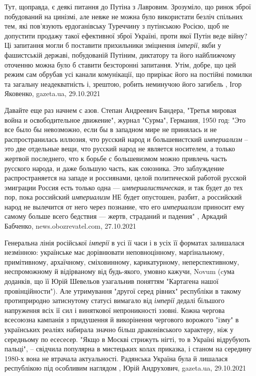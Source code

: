 Тут, щоправда, є деякі питання до Путіна з Лавровим. Зрозуміло, що ринок зброї
побудований на цинізмі, але невже не можна було використати безліч спільних
тем, які пов'язують ердоганівську Туреччину з путінською Росією, щоб не
допустити продажу такої ефективної зброї Україні, проти якої Путін веде війну?
Ці запитання могли б поставити прихильники зміцнення \emph{імперії}, якби у
фашистській державі, побудованій Путіним, диктатору та його найближчому
оточенню можна було б ставити безсторонні запитання. Утім, добре, що цей режим
сам обрубав усі канали комунікації, що прирікає його на постійні помилки та
загальну неадекватність і, зрештою, робить неминучою його загибель
, 
Ігор Яковенко, gazeta.ua, 29.10.2021

Давайте еще раз начнем с азов. Степан Андреевич Бандера, "Третья мировая война
и освободительное движение", журнал "Сурма", Германия, 1950 год: "Это все было
бы невозможно, если бы в западном мире не принялась и не распространилась
иллюзия, что русский народ и большевистский \emph{империализм} – это две отдельные
вещи, что русский народ не является носителем, а только жертвой последнего, что
к борьбе с большевизмом можно привлечь часть русского народа, и даже большую
часть, как союзника. Это заблуждение распространяется на западе и россиянами,
целой политической работой русской эмиграции Россия есть только одна —
\emph{империалистическая}, и так будет до тех пор, пока российский \emph{империализм} НЕ
будет опустошен, разбит, а российский народ не вылечится от него через
познание, что его \emph{империализм} приносит ему самому больше всего бедствия —
жертв, страданий и падения"
, 
Аркадий Бабченко, news.obozrevatel.com, 27.10.2021

Генеральна лінія російської \emph{імперії} в усі її часи і в усіх її форматах
залишалася незмінною: українське має дорівнювати неповноцінному, марґінальному,
примітивному, архаїчному, сміховинному, карикатурному, неперспективному,
неспроможному й відірваному від будь-якого, умовно кажучи, Novum (cума
доданків, що її Юрій Шевельов узагальнив поняттям "Картагена нашої
провінційности"). Але утримування "другої серед рівних" республіки в такому
протиприродно затиснутому статусі вимагало від \emph{імперії} дедалі більшого
напруження всіх її сил і виняткової непроникності ззовні. Кожна чергова
всесоюзна кампанія з придушення й викорінення чергового ворожого "ізму" в
українських реаліях набирала значно більш драконівського характеру, ніж у
середньому по есесесер. "Якщо в Москві стрижуть нігті, то в Україні відрубують
пальці", – свідчила популярна в мистецьких колах приказка, і станом на середину
1980-х вона не втрачала актуальності. Радянська Україна була й лишалася
республікою під особливим наглядом
, 
Юрій Андрухович, gazeta.ua, 29.10.2021
